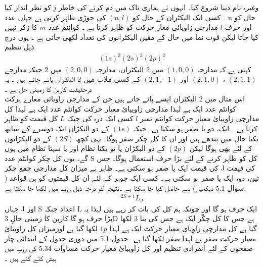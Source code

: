    وغیرہ نام دینا شروع کیا۔ انہوں نے ہماری ناک میں دم کرنے کی خاطر 
  \(j\)
    کو نظر انداز کیا ۔ کسی ایک الیکٹران کے حال کو
    \( (n,l)\) 
    کی جوڑی ظاہر کرتی ہے جہاں عدد n حال کو اور حرف
    \(l\)
      مدارجی زاویائی معار حرکت کو ظاہر کرتا ہے ۔ کوانٹم عدد
   \(m\) 
      کا زکر نہیں کیا جاتا لیکن قوت نما میں حال کے مقین الیکٹرانوں کی تعداد لکھی جاتی ہے ۔ یوں درج ذیل تنظیم 
\begin{align}
(1s)^{2}(2s)^{2}(2p)^{2} 
\end{align}
کہتی ہے کہ مدارجہ
\((1,0,0)\)
 میں 2 الیکٹران، 
مدارجہ
\(( 2,0,0)\) 
میں 2 جبکہ مدارجے
\(( 2,1,1)\)
، 
\((2,1,0)\) 
اور
 \((2,1,-1)\) 
کے کسی ملاپ میں 2 الیکٹران پائے جاتے ہیں ۔ یہ درحقیقت کاربن کا زمینی حل ہے ۔ \\
اس مثال میں 2 الیکٹران ایسے پائے جاتے ہیں جن کے مدارجی زاویائی معارے ہرکت کوانٹم  عدد ایک ہے لہذا مدارچی زاوییائ معیار حرکت کوانٹم عدد ایک ہے لہذا کل مدارچی زاوییائ معیار حرکت کوانٹم نمبر 
\(l\)
کسی ایک ذرہ کی جبک
\(L\)
کل قیمت کو ظاہر کرتا ہے ۔ ایک، دو یا صفر ہو  سکتا ہے۔ جبکہ
 \((1s)\) 
کے دو الیکڑان ایک دوسرے کے ساتھ یکتا حال میں بندھے ہیں اور ان کا کل چکر صفر ہوگا۔ یہی کچھ
\(( 2S)\)
 کے دو الیکڑانوں کے لئے بھی ہوگا لیکن
 \((2p)\)
 کے دو الیکڑان یا تو یکتا نظام اور یا سہتا نظام میں ہوں گے۔ یوں کل چکر کوانٹم عدد S کل کو ظاہر کرنے کے لئے بڑا حرف استعمال ہوگا۔ جس کی قیمت ایک یا صفر ہو سکتی ہے۔ ظاہر ہے میزان کل مدارچی جمع چکر J کی قیمت تین، دو، ایک یا صفر ہو سکتی ہے۔ کسی ایک جوہر کے لئے ان کل قیمتوں کو ہن قواعد ( سوال 5.1 دیکھیں)  سے حاصل کیا جا سکتا ہے ۔نتیجہ کو درجہ ذیل روپ میں لکھا جا سکتا ہے. 
 \begin{align}
 ^{2S+1}L_{J}
 \end{align}
  جہاں J اور S اعداد جبکہ L ایک حرف ہو گا اور چونکہ ہم کل کی بات کر رہے ہیں لہذا یہ بڑا حرف ہو گا کاربن کا زمینی حالِ 3D ہے جس کا کل چکّر ایک ہے جس کی بنا 3 لکھا گیا ہے کل مدارچی زاویای معیار حرکت ایک ہے لہذا
  \(1p\) 
  لکھا گیا ہے اورمیزان  کل زاوییائ معیار حرکت صفر ہے لہذا صفر لکھا گیا ہے۔ جدول  5.1 میں دوری جدول کے ابتدائی چار صفحوں کے لئے انفرادی  تنظیم اور کل زاوییائ معیار حرکت مساوات 5.34 کی روپ میں پیش کئے گئے ہیں ۔ \\

